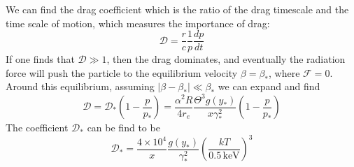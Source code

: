 \documentclass[letterpaper, 11pt]{article}
\numberwithin{equation}{section}
\numberwithin{figure}{section}
\begin{document}
We can find the drag coefficient which is the ratio of the drag timescale and the time scale of motion, which measures the importance of drag:
\begin{equation}
    \label{eq:72}
    \mathcal{D} = \frac{r}{c}\frac{1}{p}\frac{dp}{dt}
\end{equation}
If one finds that $\mathcal{D} \gg 1$, then the drag dominates, and eventually the radiation force will push the particle to the equilibrium velocity $\beta = \beta_{*}$, where $\mathcal{F} = 0$. Around this equilibrium, assuming $\left| \beta - \beta_{*} \right| \ll \beta_{*}$ we can expand and find
\begin{equation}
    \label{eq:73}
    \mathcal{D} = \mathcal{D}_{*} \left( 1 - \frac{p}{p_{*}} \right) = \frac{\alpha^2 R}{4 r_e}\frac{\Theta^3g(y_{*})}{x\gamma_{*}^2} \left( 1 - \frac{p}{p_{*}} \right)
\end{equation}
The coefficient $\mathcal{D}_{*}$ can be find to be
\begin{equation}
    \label{eq:74}
    \mathcal{D}_{*} = \frac{4\times 10^4}{x}\frac{g(y_{*})}{\gamma_{*}^2} \left( \frac{kT}{0.5\,\mathrm{keV}} \right)^3
\end{equation}
\end{document}

